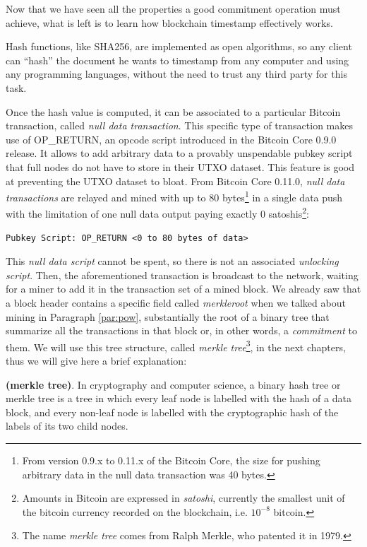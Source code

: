 \bigskip
\noindent
Now that we have seen all the properties a good commitment operation must achieve, what is left is to learn how blockchain timestamp effectively works.

\bigskip
\noindent
Hash functions, like SHA256, are implemented as open algorithms, so any client can \enquote{hash} the document he wants to timestamp from any computer and using any programming languages, without the need to trust any third party for this task.

\bigskip
\noindent
Once the hash value is computed, it can be associated to a particular Bitcoin transaction, called \textit{null data transaction}. This specific type of transaction makes use of OP\_RETURN, an opcode script introduced in the Bitcoin Core 0.9.0 release. It allows to add arbitrary data to a provably unspendable pubkey script that full nodes do not have to store in their UTXO dataset. This feature is good at preventing the UTXO dataset to bloat. From Bitcoin Core 0.11.0, \textit{null data transactions} are relayed and mined with up to 80 bytes\footnote{From version 0.9.x to 0.11.x of the Bitcoin Core, the size for pushing arbitrary data in the null data transaction was 40 bytes.} in a single data push with the limitation of one null data output paying exactly 0 satoshis\footnote{Amounts in Bitcoin are expressed in \textit{satoshi}, currently the smallest unit of the bitcoin currency recorded on the blockchain, i.e. $10^{-8}$ bitcoin.}: 
\begin{verbatim}
Pubkey Script: OP_RETURN <0 to 80 bytes of data>
\end{verbatim}
This \textit{null data script} cannot be spent, so there is not an associated \textit{unlocking script}. Then, the aforementioned transaction is broadcast to the network, waiting for a miner to add it in the transaction set of a mined block. We already saw that a block header contains a specific field called \textit{merkleroot} when we talked about mining in Paragraph \ref{par:pow}, substantially the root of a binary tree that summarize all the transactions in that block or, in other words, a \textit{commitment} to them. We will use this tree structure, called \textit{merkle tree}\textup{\footnote{The name \textit{merkle tree} comes from Ralph Merkle, who patented it in 1979.}}, in the next chapters, thus we will give here a brief explanation:

\begin{mydef}{\bf (merkle tree)}.
    \label{def:merkle}
    In cryptography and computer science, a binary hash tree or merkle tree is a tree in which every leaf node is labelled with the hash of a data block, and every non-leaf node is labelled with the cryptographic hash of the labels of its two child nodes.
\end{mydef}

